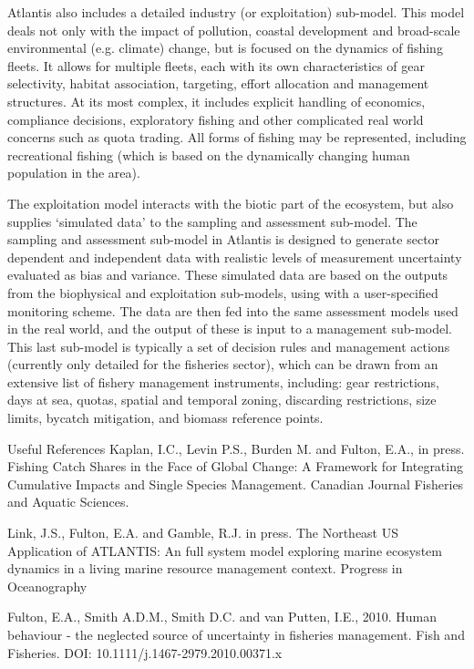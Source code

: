 \documentclass{report}
\begin{document}
Atlantis also includes a detailed industry (or exploitation) sub-model. This model deals not only with the impact of pollution, coastal development and broad-scale environmental (e.g. climate) change, but is focused on the dynamics of fishing fleets. It allows for multiple fleets, each with its own characteristics of gear selectivity, habitat association, targeting, effort allocation and management structures. At its most complex, it includes explicit handling of economics, compliance decisions, exploratory fishing and other complicated real world concerns such as quota trading. All forms of fishing may be represented, including recreational fishing (which is based on the dynamically changing human population in the area).

The exploitation model interacts with the biotic part of the ecosystem, but also supplies ‘simulated data’ to the sampling and assessment sub-model. The sampling and assessment sub-model in Atlantis is designed to generate sector dependent and independent data with realistic levels of measurement uncertainty evaluated as bias and variance. These simulated data are based on the outputs from the biophysical and exploitation sub-models, using with a user-specified monitoring scheme. The data are then fed into the same assessment models used in the real world, and the output of these is input to a management sub-model. This last sub-model is typically a set of decision rules and management actions (currently only detailed for the fisheries sector), which can be drawn from an extensive list of fishery management instruments, including: gear restrictions, days at sea, quotas, spatial and temporal zoning, discarding restrictions, size limits, bycatch mitigation, and biomass reference points.


Useful References
Kaplan, I.C., Levin P.S., Burden M. and Fulton, E.A., in press. Fishing Catch Shares in the Face of Global Change: A Framework for Integrating Cumulative Impacts and Single Species Management. Canadian Journal Fisheries and Aquatic Sciences.

Link, J.S., Fulton, E.A. and Gamble, R.J. in press. The Northeast US Application of ATLANTIS: An full system model exploring marine ecosystem dynamics in a living marine resource management context. Progress in Oceanography

Fulton, E.A., Smith A.D.M., Smith D.C. and van Putten, I.E., 2010. Human behaviour - the neglected source of uncertainty in fisheries management. Fish and Fisheries. DOI: 10.1111/j.1467-2979.2010.00371.x
\end{document}
